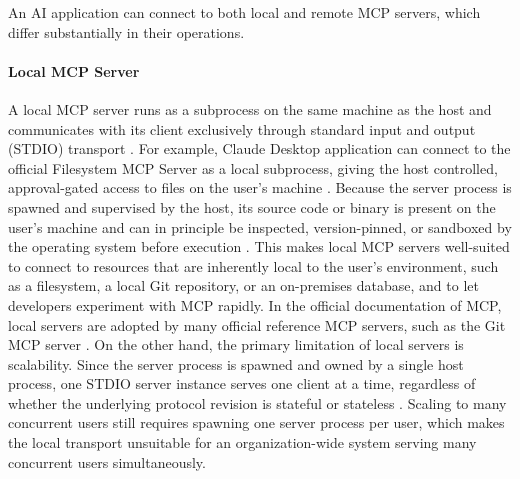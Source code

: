 \documentclass[english, 12pt, a4paper, elec, utf8, a-2b, online]{aaltothesis}
\begin{document}
An AI application can connect to both local and remote MCP servers, which differ substantially in their operations.

\paragraph{Local MCP Server}
A local MCP server runs as a subprocess on the same machine as the host and communicates with its client exclusively through standard input and output (STDIO) transport \cite{mcpspec2026}.
For example, Claude Desktop application can connect to the official Filesystem MCP Server \cite{mcpfilesystem2026} as a local subprocess, giving the host controlled, approval-gated access to files on the user's machine \cite{mcplocalservers2026}.
Because the server process is spawned and supervised by the host, its source code or binary is present on the user's machine and can in principle be inspected, version-pinned, or sandboxed by the operating system before execution \cite{park2026attacksurface}.
This makes local MCP servers well-suited to connect to resources that are inherently local to the user's environment, such as a filesystem, a local Git repository, or an on-premises database, and to let developers experiment with MCP rapidly.
In the official documentation of MCP, local servers are adopted by many official reference MCP servers, such as the Git MCP server \cite{mcpexamples2026}.
On the other hand, the primary limitation of local servers is scalability.
Since the server process is spawned and owned by a single host process, one STDIO server instance serves one client at a time, regardless of whether the underlying protocol revision is stateful or stateless \cite{mcpspec2026, mcpstdio2026}.
Scaling to many concurrent users still requires spawning one server process per user, which makes the local transport unsuitable for an organization-wide system serving many concurrent users simultaneously.
 
\end{document}

